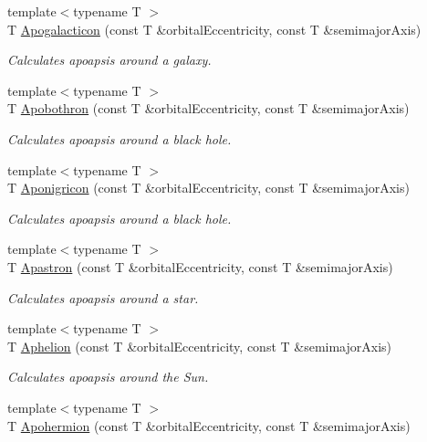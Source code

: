 \begin{DoxyCompactItemize}
{\footnotesize template$<$typename T $>$ }\\T \mbox{\hyperlink{group___e_g_x_phys-_apoapsis_ga09b4c7d5e971dc28e1ba37f479958c27}{Apogalacticon}} (const T \&orbital\+Eccentricity, const T \&semimajor\+Axis)
\begin{DoxyCompactList}\small\item\em Calculates apoapsis around a galaxy. \end{DoxyCompactList}\item 
{\footnotesize template$<$typename T $>$ }\\T \mbox{\hyperlink{group___e_g_x_phys-_apoapsis_ga6fe084b9e69f47a5032b05aa8f6bf7ad}{Apobothron}} (const T \&orbital\+Eccentricity, const T \&semimajor\+Axis)
\begin{DoxyCompactList}\small\item\em Calculates apoapsis around a black hole. \end{DoxyCompactList}\item 
{\footnotesize template$<$typename T $>$ }\\T \mbox{\hyperlink{group___e_g_x_phys-_apoapsis_ga83e866e2f887ff8eafbc3971d4cab8be}{Aponigricon}} (const T \&orbital\+Eccentricity, const T \&semimajor\+Axis)
\begin{DoxyCompactList}\small\item\em Calculates apoapsis around a black hole. \end{DoxyCompactList}\item 
{\footnotesize template$<$typename T $>$ }\\T \mbox{\hyperlink{group___e_g_x_phys-_apoapsis_ga2fc1c406ce10f59b4f325150aecd279a}{Apastron}} (const T \&orbital\+Eccentricity, const T \&semimajor\+Axis)
\begin{DoxyCompactList}\small\item\em Calculates apoapsis around a star. \end{DoxyCompactList}\item 
{\footnotesize template$<$typename T $>$ }\\T \mbox{\hyperlink{group___e_g_x_phys-_apoapsis_ga77dadb4d082a441c8e85203c983722c7}{Aphelion}} (const T \&orbital\+Eccentricity, const T \&semimajor\+Axis)
\begin{DoxyCompactList}\small\item\em Calculates apoapsis around the Sun. \end{DoxyCompactList}\item 
{\footnotesize template$<$typename T $>$ }\\T \mbox{\hyperlink{group___e_g_x_phys-_apoapsis_gab002349e578241b3514f2212da9a7d48}{Apohermion}} (const T \&orbital\+Eccentricity, const T \&semimajor\+Axis)

\end{DoxyCompactItemize}

